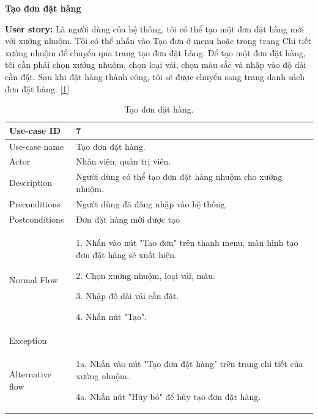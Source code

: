 \newpage
\textbf{Tạo đơn đặt hàng}\par
\textbf{User story:} Là người dùng của hệ thống, tôi có thể tạo một đơn đặt hàng mới với xưởng nhuộm. Tôi có thể nhấn vào Tạo đơn ở menu hoặc trong trang Chi tiết xưởng nhuộm để chuyển qua trang tạo đơn đặt hàng. Để tạo một đơn đặt hàng, tôi cần phải chọn xưởng nhuộm, chọn loại vải, chọn màu sắc và nhập vào độ dài cần đặt. Sau khi đặt hàng thành công, tôi sẽ được chuyển sang trang danh sách đơn đặt hàng. [\ref{bang7}]
\begin{table}[!htp]
    \centering
    \begin{tabular}{|m{3cm}|m{10cm}|}
    \hline 
        Use-case ID & 7\\ \hline
        Use-case name & Tạo đơn đặt hàng.\\ \hline
        Actor & Nhân viên, quản trị viên.\\ \hline
        Description & Người dùng có thể tạo đơn đặt hàng nhuộm cho xưởng nhuộm.\\ \hline
        Preconditions & Người dùng đã đăng nhập vào hệ thống.\\ \hline
        Postconditions & Đơn đặt hàng mới được tạo\\ \hline
        Normal Flow & 
        1. Nhấn vào nút "Tạo đơn" trên thanh menu, màn hình tạo đơn đặt hàng sẽ xuất hiện.\par
        2. Chọn xưởng nhuộm, loại vải, màu.\par
        3. Nhập độ dài vải cần đặt.\par
        4. Nhấn nút "Tạo".
        \\ \hline
        Exception & \\ \hline
        Alternative flow & 
        1a. Nhấn vào nút "Tạo đơn đặt hàng" trên trang chi tiết của xưởng nhuộm.\par
        4a. Nhấn nút "Hủy bỏ" để hủy tạo đơn đặt hàng.
        \\ 
    \hline 
    \end{tabular}
    \caption{Tạo đơn đặt hàng.}
    \label{bang7}
\end{table}

